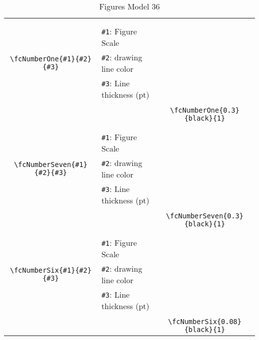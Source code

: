 \documentclass[x11names]{article}
\begin{document}
\begin{table}[H]
\begin{tabular}{|c|l|c|}
	&&\multirow{5}{*}{\fcNumberOne{0.3}{black}{1}}\\	&&\\	&\verb|#1|: Figure Scale &\\	\verb|\fcNumberOne{#1}{#2}{#3}|&	\verb|#2|: drawing line color &\\	&\verb|#3|: Line thickness (pt) &\\ &&\\&&	\verb|\fcNumberOne{0.3}{black}{1}|\\\hline 	
	&&\multirow{5}{*}{\fcNumberSeven{0.3}{black}{1}}\\	&&\\	&\verb|#1|: Figure Scale &\\	\verb|\fcNumberSeven{#1}{#2}{#3}|&	\verb|#2|: drawing line color &\\	&\verb|#3|: Line thickness (pt) &\\ &&\\&&	\verb|\fcNumberSeven{0.3}{black}{1}|\\\hline 	
	&&\multirow{5}{*}{\fcNumberSix{0.08}{black}{1}}\\	&&\\	&\verb|#1|: Figure Scale &\\	\verb|\fcNumberSix{#1}{#2}{#3}|&	\verb|#2|: drawing line color &\\	&\verb|#3|: Line thickness (pt) &\\ &&\\&&	\verb|\fcNumberSix{0.08}{black}{1}|\\\hline 	\hline\end{tabular}\caption{Figures Model 36}\label{tab36}\end{table}
\end{document}
